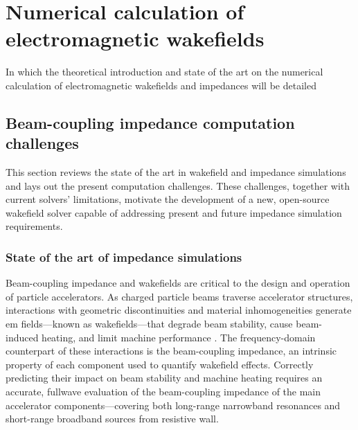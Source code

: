 %
\chapter{Numerical calculation of electromagnetic wakefields}
\label{ch::chapter3}

\begin{center}
\begin{minipage}{0.5\textwidth}
\begin{small}
In which the theoretical introduction and state of the art on the numerical calculation of electromagnetic wakefields and impedances will be detailed
\end{small}
\end{minipage}
\vspace{0.5cm}
\end{center}

\section{Beam-coupling impedance computation challenges}
This section reviews the state of the art in wakefield and impedance simulations and lays out the present computation challenges. These challenges, together with current solvers' limitations, motivate the development of a new, open-source wakefield solver capable of addressing present and future impedance simulation requirements.

\subsection{State of the art of impedance simulations}

Beam-coupling impedance and wakefields are critical to the design and operation of particle accelerators. As charged particle beams traverse accelerator structures, interactions with geometric discontinuities and material inhomogeneities generate \gls{em} fields---known as wakefields---that degrade beam stability, cause beam-induced heating, and limit machine performance \cite{metral_impedance_2020}. The frequency-domain counterpart of these interactions is the beam-coupling impedance, an intrinsic property of each component used to quantify wakefield effects. Correctly predicting their impact on beam stability and machine heating requires an accurate, fullwave evaluation of the beam-coupling impedance of the main accelerator components---covering both long-range narrowband resonances and short-range broadband sources from resistive wall.

